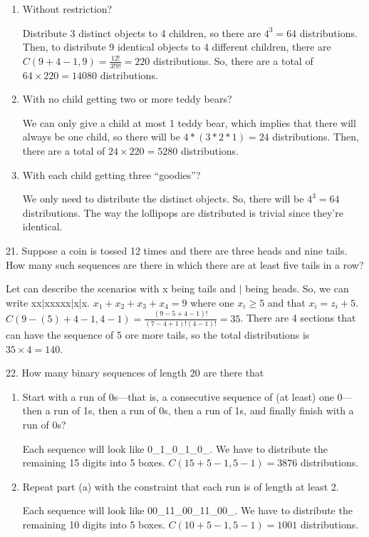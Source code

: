 \documentclass[12pt]{article}
\begin{document}
\begin{enumerate}[label=(\alph*)]
    \item Without restriction?
    \begin{solution}
        Distribute 3 distinct objects to 4 children, so there are 
        $4^3 = 64$ distributions. Then, to distribute 9 identical objects 
        to 4 different children, there are 
        $C(9+4-1, 9)=\frac{12!}{3!9!}=220$ 
        distributions. So, there are a total of $64\times220 = 14080$ 
        distributions.
    \end{solution}
    \item With no child getting two or more teddy bears?
    \begin{solution}
        We can only give a child at most 1 teddy bear, which implies 
        that there will always be one child, so there will be 
        $4*(3*2*1)=24$ distributions. Then, there are a total of 
        $24\times220=5280$ distributions.  
    \end{solution}
    \item With each child getting three “goodies”?
    \begin{solution}
        We only need to distribute the distinct objects. So, there 
        will be $4^3 = 64$ distributions. The way the lollipops are 
        distributed is trivial since they're identical. 
    \end{solution}
\end{enumerate}
21. Suppose a coin is tossed 12 times and there are three heads and nine 
tails. How many such sequences are there in which there are at least 
five tails in a row?
\begin{solution}
    Let can describe the scenarios with x being tails and $\vert$ being
    heads. So, we can write xx$\vert$xxxxx$\vert$x$\vert$x. 
    $x_1+x_2+x_3+x_4=9$ where one $x_i\ge5$ and that $x_i = z_i + 5$. 
    $C(9-(5)+4-1, 4-1) = \frac{(9-5+4-1)!}{(7-4+1)!(4-1)!} = 35$. There 
    are 4 sections that can have the sequence 
    of 5 ore more tails, so the total distributions is $35\times4=140$. 
\end{solution}
22. How many binary sequences of length 20 are there that
\begin{enumerate}[label=(\alph*)]
    \item Start with a run of 0s—that is, a consecutive sequence of 
    (at least) one 0— then a run of 1s, then a run of 0s, then a run 
    of 1s, and finally finish with a run of 0s?
    \begin{solution}
        Each sequence will look like 0\_1\_0\_1\_0\_. We have to distribute
        the remaining 15 digits into 5 boxes. $C(15+5-1, 5-1)=3876$ 
        distributions. 
    \end{solution}
    \item Repeat part (a) with the constraint that each run is of length 
    at least 2.
    \begin{solution}
        Each sequence will look like 00\_11\_00\_11\_00\_. We have to 
        distribute the remaining 10 digits into 5 boxes. 
        $C(10+5-1, 5-1) = 1001$ distributions. 
    \end{solution}
\end{enumerate}
\end{document}
